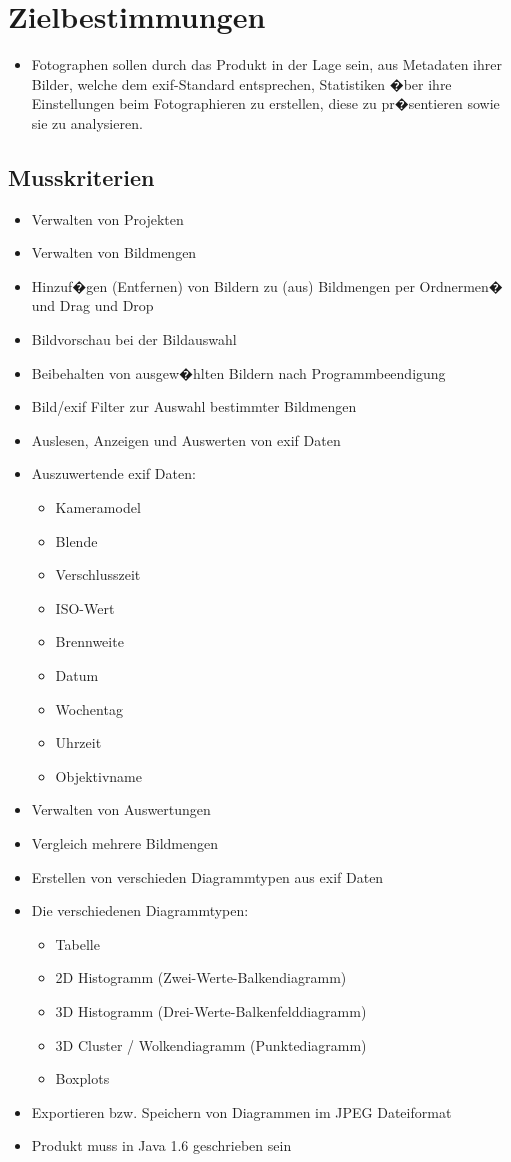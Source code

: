 \section{Zielbestimmungen}
\begin{itemize}
  \item Fotographen sollen durch das Produkt in der Lage sein, aus Metadaten ihrer Bilder, welche dem \gls{exif}-Standard entsprechen, Statistiken �ber ihre Einstellungen beim Fotographieren zu erstellen, diese zu pr�sentieren sowie sie zu analysieren.
  \end{itemize} 
\subsection{Musskriterien} 
\begin{itemize}
	\item Verwalten von Projekten
	\item Verwalten von Bildmengen
	\item Hinzuf�gen (Entfernen) von Bildern zu (aus) Bildmengen per Ordnermen� und Drag und Drop
	\item Bildvorschau bei der Bildauswahl
	\item Beibehalten von ausgew�hlten Bildern nach Programmbeendigung
	\item Bild/\gls{exif} Filter zur Auswahl bestimmter Bildmengen
	\item Auslesen, Anzeigen und Auswerten von \gls{exif} Daten
	\item Auszuwertende \gls{exif} Daten:
			\begin{itemize}
			\item Kameramodel
			\item Blende 
			\item Verschlusszeit
			\item ISO-Wert
			\item Brennweite
			\item Datum
			\item Wochentag
			\item Uhrzeit
			\item Objektivname
		\end{itemize}
	\item Verwalten von Auswertungen
	\item Vergleich mehrere Bildmengen
	\item Erstellen von verschieden Diagrammtypen aus \gls{exif} Daten
	\item Die verschiedenen Diagrammtypen:
		\begin{itemize}
		  \item Tabelle
			\item 2D Histogramm (Zwei-Werte-Balkendiagramm)
			\item 3D Histogramm (Drei-Werte-Balkenfelddiagramm)
			\item 3D Cluster / Wolkendiagramm (Punktediagramm)
			\item Boxplots
		\end{itemize}
	\item Exportieren bzw. Speichern von Diagrammen im JPEG Dateiformat
	\item Produkt muss in Java 1.6 geschrieben sein	
\end{itemize}

